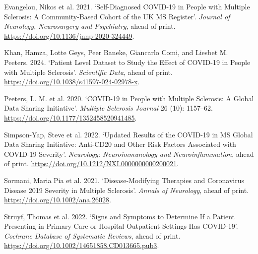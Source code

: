 \documentclass[
  british,
]{article}
\newlength{\cslhangindent}
\newenvironment{CSLReferences}[2] %
 {\begin{list}{}{%
  \setlength{\itemindent}{0pt}
  \setlength{\leftmargin}{0pt}
  \setlength{\parsep}{0pt}
  \ifodd #1
   \setlength{\leftmargin}{\cslhangindent}
   \setlength{\itemindent}{-1\cslhangindent}
  \fi
  \setlength{\itemsep}{#2\baselineskip}}}
 {\end{list}}
\begin{document}
\protect{}\label{refs}
\begin{CSLReferences}{1}{1}
{Evangelou, Nikos et al.} 2021. {`Self-Diagnosed COVID-19 in People with
Multiple Sclerosis: A Community-Based Cohort of the UK MS Register'}.
\emph{Journal of Neurology, Neurosurgery and Psychiatry}, ahead of
print. \url{https://doi.org/10.1136/jnnp-2020-324449}.

Khan, Hamza, Lotte Geys, Peer Baneke, Giancarlo Comi, and Liesbet M.
Peeters. 2024. {`Patient Level Dataset to Study the Effect of COVID-19
in People with Multiple Sclerosis'}. \emph{Scientific Data}, ahead of
print. \url{https://doi.org/10.1038/s41597-024-02978-x}.

{Peeters, L. M. et al.} 2020. {`{COVID-19} in People with Multiple
Sclerosis: A Global Data Sharing Initiative'}. \emph{Multiple Sclerosis
Journal} 26 (10): 1157--62.
\url{https://doi.org/10.1177/1352458520941485}.

{Simpson-Yap, Steve et al.} 2022. {`Updated Results of the COVID-19 in
MS Global Data Sharing Initiative: Anti-CD20 and Other Risk Factors
Associated with COVID-19 Severity'}. \emph{Neurology: Neuroimmunology
and Neuroinflammation}, ahead of print.
\url{https://doi.org/10.1212/NXI.0000000000200021}.

{Sormani, Maria Pia et al.} 2021. {`Disease-Modifying Therapies and
Coronavirus Disease 2019 Severity in Multiple Sclerosis'}. \emph{Annals
of Neurology}, ahead of print. \url{https://doi.org/10.1002/ana.26028}.

{Struyf, Thomas et al.} 2022. {`Signs and Symptoms to Determine If a
Patient Presenting in Primary Care or Hospital Outpatient Settings Has
COVID-19'}. \emph{Cochrane Database of Systematic Reviews}, ahead of
print. \url{https://doi.org/10.1002/14651858.CD013665.pub3}.

\end{CSLReferences}
\end{document}
